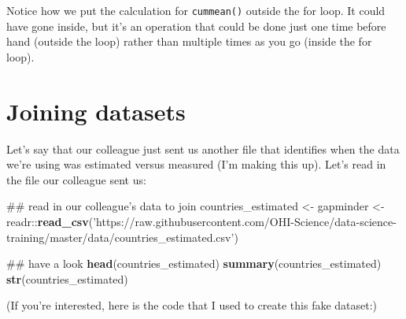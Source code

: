 \documentclass[]{book}
\newenvironment{Shaded}{\begin{snugshade}}{\end{snugshade}}
\newcommand{\KeywordTok}[1]{\textcolor[rgb]{0.13,0.29,0.53}{\textbf{{#1}}}}
\newcommand{\DataTypeTok}[1]{\textcolor[rgb]{0.13,0.29,0.53}{{#1}}}
\newcommand{\DecValTok}[1]{\textcolor[rgb]{0.00,0.00,0.81}{{#1}}}
\newcommand{\StringTok}[1]{\textcolor[rgb]{0.31,0.60,0.02}{{#1}}}
\newcommand{\NormalTok}[1]{{#1}}
\theoremstyle{definition}
\theoremstyle{definition}
\theoremstyle{definition}
\theoremstyle{remark}
\begin{document}
Notice how we put the calculation for \texttt{cummean()} outside the for
loop. It could have gone inside, but it's an operation that could be
done just one time before hand (outside the loop) rather than multiple
times as you go (inside the for loop).

\section{Joining datasets}\label{joining-datasets}

Let's say that our colleague just sent us another file that identifies
when the data we're using was estimated versus measured (I'm making this
up). Let's read in the file our colleague sent us:

\begin{Shaded}
\begin{Highlighting}[]
\NormalTok{## read in our colleague's data to join}
\NormalTok{countries_estimated <-}\StringTok{ }\NormalTok{gapminder <-}\StringTok{ }\NormalTok{readr::}\KeywordTok{read_csv}\NormalTok{(}\StringTok{'https://raw.githubusercontent.com/OHI-Science/data-science-training/master/data/countries_estimated.csv'}\NormalTok{)}

\NormalTok{## have a look}
\KeywordTok{head}\NormalTok{(countries_estimated)}
\KeywordTok{summary}\NormalTok{(countries_estimated)}
\KeywordTok{str}\NormalTok{(countries_estimated)}
\end{Highlighting}
\end{Shaded}

(If you're interested, here is the code that I used to create this fake
dataset:)

\begin{Shaded}
\end{Shaded}
\end{document}
